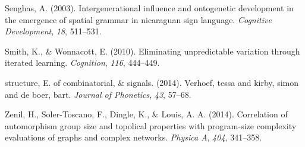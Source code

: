 \documentclass[10pt, letterpaper]{article}
\begin{document}
\hypertarget{ref-senghas-2003}{}
Senghas, A. (2003). Intergenerational influence and ontogenetic
development in the emergence of spatial grammar in nicaraguan sign
language. \emph{Cognitive Development}, \emph{18}, 511--531.

\hypertarget{ref-smith-2010}{}
Smith, K., \& Wonnacott, E. (2010). Eliminating unpredictable variation
through iterated learning. \emph{Cognition}, \emph{116}, 444--449.

\hypertarget{ref-verhoef-2014}{}
structure, E. of combinatorial, \& signals. (2014). Verhoef, tessa and
kirby, simon and de boer, bart. \emph{Journal of Phonetics}, \emph{43},
57--68.

\hypertarget{ref-zenil-2014}{}
Zenil, H., Soler-Toscano, F., Dingle, K., \& Louis, A. A. (2014).
Correlation of automorphism group size and topolical properties with
program-size complexity evaluations of graphs and complex networks.
\emph{Physica A}, \emph{404}, 341--358.


\end{document}
